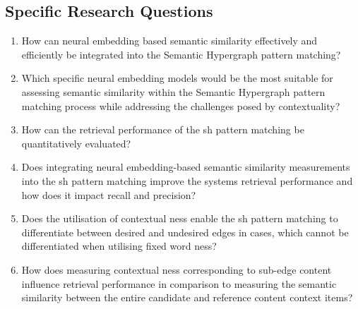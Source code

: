 \documentclass[11pt]{scrreprt}
\begin{document}
\subsection{Specific Research Questions}
\begin{enumerate}[label=\textbf{R.\arabic*}, leftmargin=0pt, labelwidth=*, align=left, labelsep=0.5em, itemindent=0pt, listparindent=\parindent]
	\item How can neural embedding based semantic similarity effectively and efficiently be integrated into the Semantic Hypergraph pattern matching?

    \item Which specific neural embedding models would be the most suitable for assessing semantic similarity within the Semantic Hypergraph pattern matching process while addressing the challenges posed by contextuality?

	\item How can the retrieval performance of the \gls{sh} pattern matching be quantitatively evaluated?

    \item Does integrating neural embedding-based semantic similarity measurements into the \gls{sh} pattern matching improve the systems retrieval performance and how does it impact recall and precision?

    \item Does the utilisation of contextual \gls{ness} enable the \gls{sh} pattern matching to differentiate between desired and undesired edges in cases, which cannot be differentiated when utilising fixed word \gls{ness}?
    
    \item How does measuring contextual \gls{ness} corresponding to sub-edge content influence retrieval performance in comparison to measuring the semantic similarity between the entire candidate and reference content context items?


\end{enumerate}
\end{document}
